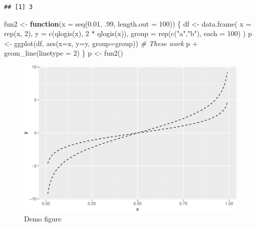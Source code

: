 \documentclass[
]{article}
\newenvironment{Shaded}{\begin{snugshade}}{\end{snugshade}}
\newcommand{\AttributeTok}[1]{\textcolor[rgb]{0.77,0.63,0.00}{#1}}
\newcommand{\CommentTok}[1]{\textcolor[rgb]{0.56,0.35,0.01}{\textit{#1}}}
\newcommand{\ControlFlowTok}[1]{\textcolor[rgb]{0.13,0.29,0.53}{\textbf{#1}}}
\newcommand{\DecValTok}[1]{\textcolor[rgb]{0.00,0.00,0.81}{#1}}
\newcommand{\FloatTok}[1]{\textcolor[rgb]{0.00,0.00,0.81}{#1}}
\newcommand{\FunctionTok}[1]{\textcolor[rgb]{0.00,0.00,0.00}{#1}}
\newcommand{\NormalTok}[1]{#1}
\newcommand{\OtherTok}[1]{\textcolor[rgb]{0.56,0.35,0.01}{#1}}
\newcommand{\SpecialCharTok}[1]{\textcolor[rgb]{0.00,0.00,0.00}{#1}}
\newcommand{\StringTok}[1]{\textcolor[rgb]{0.31,0.60,0.02}{#1}}
\begin{document}
\begin{verbatim}
## [1] 3
\end{verbatim}

\begin{Shaded}
\begin{Highlighting}[]
\NormalTok{fun2 }\OtherTok{\textless{}{-}} \ControlFlowTok{function}\NormalTok{(}\AttributeTok{x =} \FunctionTok{seq}\NormalTok{(}\FloatTok{0.01}\NormalTok{, .}\DecValTok{99}\NormalTok{, }\AttributeTok{length.out =} \DecValTok{100}\NormalTok{)) \{}
\NormalTok{   df }\OtherTok{\textless{}{-}} \FunctionTok{data.frame}\NormalTok{(}
     \AttributeTok{x =} \FunctionTok{rep}\NormalTok{(x, }\DecValTok{2}\NormalTok{),}
     \AttributeTok{y =} \FunctionTok{c}\NormalTok{(}\FunctionTok{qlogis}\NormalTok{(x), }\DecValTok{2} \SpecialCharTok{*} \FunctionTok{qlogis}\NormalTok{(x)),}
     \AttributeTok{group =} \FunctionTok{rep}\NormalTok{(}\FunctionTok{c}\NormalTok{(}\StringTok{"a"}\NormalTok{,}\StringTok{"b"}\NormalTok{),}
     \AttributeTok{each =} \DecValTok{100}\NormalTok{)}
\NormalTok{   )}
\NormalTok{   p }\OtherTok{\textless{}{-}} \FunctionTok{ggplot}\NormalTok{(df, }\FunctionTok{aes}\NormalTok{(}\AttributeTok{x=}\NormalTok{x, }\AttributeTok{y=}\NormalTok{y, }\AttributeTok{group=}\NormalTok{group))}
   \CommentTok{\# These work}
\NormalTok{   p }\SpecialCharTok{+} \FunctionTok{geom\_line}\NormalTok{(}\AttributeTok{linetype =} \DecValTok{2}\NormalTok{)}
\NormalTok{\}}
\NormalTok{p }\OtherTok{\textless{}{-}} \FunctionTok{fun2}\NormalTok{()}
\end{Highlighting}
\end{Shaded}

\begin{figure}
\centering
\includegraphics{Rtips2_files/figure-latex/fig4-1.pdf}
\caption{\label{fig:fig4}Demo figure}
\end{figure}
\end{document}
